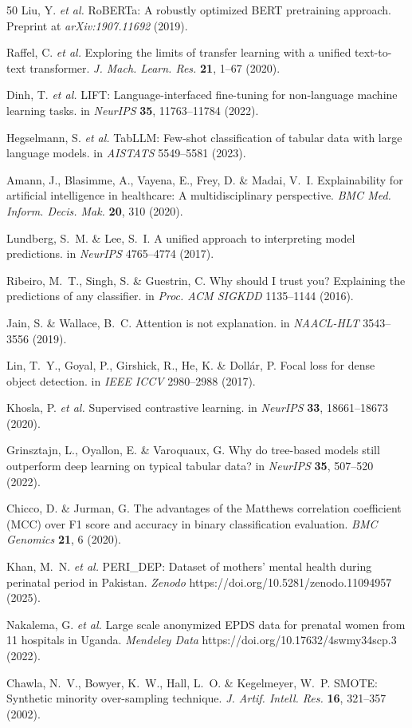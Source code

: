 \documentclass[12pt,a4paper]{article}
\begin{document}
\begin{thebibliography}{50}
 Liu, Y. \textit{et al.} RoBERTa: A robustly optimized BERT pretraining approach. Preprint at \textit{arXiv:1907.11692} (2019).

 Raffel, C. \textit{et al.} Exploring the limits of transfer learning with a unified text-to-text transformer. \textit{J. Mach. Learn. Res.} \textbf{21}, 1--67 (2020).

 Dinh, T. \textit{et al.} LIFT: Language-interfaced fine-tuning for non-language machine learning tasks. in \textit{NeurIPS} \textbf{35}, 11763--11784 (2022).

 Hegselmann, S. \textit{et al.} TabLLM: Few-shot classification of tabular data with large language models. in \textit{AISTATS} 5549--5581 (2023).

 Amann, J., Blasimme, A., Vayena, E., Frey, D. \& Madai, V.~I. Explainability for artificial intelligence in healthcare: A multidisciplinary perspective. \textit{BMC Med. Inform. Decis. Mak.} \textbf{20}, 310 (2020).

 Lundberg, S.~M. \& Lee, S.~I. A unified approach to interpreting model predictions. in \textit{NeurIPS} 4765--4774 (2017).

 Ribeiro, M.~T., Singh, S. \& Guestrin, C. Why should I trust you? Explaining the predictions of any classifier. in \textit{Proc. ACM SIGKDD} 1135--1144 (2016).

 Jain, S. \& Wallace, B.~C. Attention is not explanation. in \textit{NAACL-HLT} 3543--3556 (2019).

 Lin, T.~Y., Goyal, P., Girshick, R., He, K. \& Doll\'{a}r, P. Focal loss for dense object detection. in \textit{IEEE ICCV} 2980--2988 (2017).

 Khosla, P. \textit{et al.} Supervised contrastive learning. in \textit{NeurIPS} \textbf{33}, 18661--18673 (2020).

 Grinsztajn, L., Oyallon, E. \& Varoquaux, G. Why do tree-based models still outperform deep learning on typical tabular data? in \textit{NeurIPS} \textbf{35}, 507--520 (2022).

 Chicco, D. \& Jurman, G. The advantages of the Matthews correlation coefficient (MCC) over F1 score and accuracy in binary classification evaluation. \textit{BMC Genomics} \textbf{21}, 6 (2020).

 Khan, M.~N. \textit{et al.} PERI\_DEP: Dataset of mothers' mental health during perinatal period in Pakistan. \textit{Zenodo} https://doi.org/10.5281/zenodo.11094957 (2025).

 Nakalema, G. \textit{et al.} Large scale anonymized EPDS data for prenatal women from 11 hospitals in Uganda. \textit{Mendeley Data} https://doi.org/10.17632/4swmy34scp.3 (2022).

 Chawla, N.~V., Bowyer, K.~W., Hall, L.~O. \& Kegelmeyer, W.~P. SMOTE: Synthetic minority over-sampling technique. \textit{J. Artif. Intell. Res.} \textbf{16}, 321--357 (2002).

\end{thebibliography}
\end{document}
